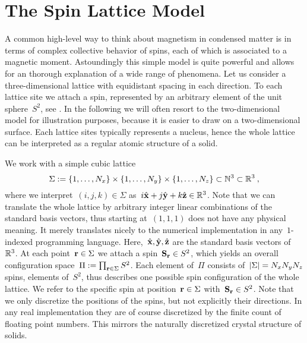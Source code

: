 \section{The Spin Lattice Model}\label{sec:model}
%
A common high-level way to think about magnetism in condensed matter is in terms
of complex collective behavior of spins, each of which is associated to a
magnetic moment. Astoundingly this simple model is quite powerful and allows for
an thorough explanation of a wide range of phenomena. Let us consider a
three-dimensional lattice with equidistant spacing in each direction. To each
lattice site we attach a spin, represented by an arbitrary element of the unit
sphere~$S^2$, see . In the following we will often resort to
the two-dimensional model for illustration purposes, because it is easier to
draw on a two-dimensional surface. Each lattice sites typically represents a
nucleus, hence the whole lattice can be interpreted as a regular atomic
structure of a solid.

We work with a simple cubic lattice
%
\begin{equation}
  \Sigma := \{1,\dots,N_x\} \times \{1,\dots,N_y\} \times
  \{1,\dots,N_z\} \subset \mathbb{N}^3 \subset \mathbb{R}^3\:,
\end{equation}
%
where we interpret~$(i,j,k) \in \Sigma$ as~$i \hat{\mathbf{x}} + j \hat{\mathbf{y}} + k \hat{\mathbf{z}}
\in \mathbb{R}^3$. Note that we can translate the whole lattice by arbitrary integer
linear combinations of the standard basis vectors, thus starting at~$(1,1,1)$
does not have any physical meaning. It merely translates nicely to the numerical
implementation in any~$1$-indexed programming language. Here,~$\hat{\mathbf{x}},
\hat{\mathbf{y}}, \hat{\mathbf{z}}$ are the standard basis vectors of~$\mathbb{R}^3$. At each point~$\mathbf{r}
\in \Sigma$ we attach a spin~$\mathbf{S}_{\mathbf{r}} \in S^2$, which yields an overall
configuration space~$\Pi := \prod_{\mathbf{r} \in \Sigma} S^2$.  Each element of~$\Pi$
consists of~$\abs{\Sigma}=N_x N_y N_z$ spins, \ie{} elements of~$S^2$, thus
describes one possible spin configuration of the whole lattice. We refer to the
specific spin at position~$\mathbf{r} \in \Sigma$ with~$\mathbf{S}_{\mathbf{r}} \in S^2$.  Note that we
only discretize the positions of the spins, but not explicitly their directions.
In any real implementation they are of course discretized by the finite count of
floating point numbers. This mirrors the naturally discretized crystal structure
of solids.


